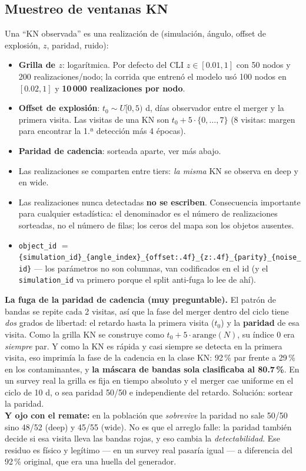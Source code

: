 \documentclass[11pt,a4paper]{article}
\newcommand{\code}[1]{\texttt{\small #1}}
\newlength{\examenpad}
\newenvironment{examen}
  {\par\medskip\noindent
   \begin{lrbox}{\examenbox}%
   \begin{minipage}{\dimexpr\linewidth-2\examenpad}\small}
  {\end{minipage}%
   \end{lrbox}%
   {\setlength{\fboxsep}{\examenpad}\colorbox{boxgray}{\usebox{\examenbox}}}%
   \par\medskip}
\begin{document}
\subsection{Muestreo de ventanas KN}
Una ``KN observada'' es una realización de
(simulación, ángulo, offset de explosión, $z$, paridad, ruido):
\begin{itemize}[nosep]
  \item \textbf{Grilla de $z$}: logarítmica. Por defecto del CLI $z\in[0.01,1]$ con 50 nodos y 200
        realizaciones/nodo; la corrida que entrenó el modelo usó 100 nodos en $[0.02,1]$ y
        \textbf{10\,000 realizaciones por nodo}.
  \item \textbf{Offset de explosión}: $t_0 \sim U[0,5)$ d, días observador entre el merger y la
        primera visita. Las visitas de una KN son $t_0 + 5\cdot\{0,\dots,7\}$ (8 visitas: margen para
        encontrar la 1.ª detección más 4 épocas).
  \item \textbf{Paridad de cadencia}: sorteada aparte, ver más abajo.
  \item Las realizaciones se comparten entre tiers: \emph{la misma} KN se observa en deep y en wide.
  \item Las realizaciones nunca detectadas \textbf{no se escriben}. Consecuencia importante para
        cualquier estadística: el denominador es el número de realizaciones sorteadas, no el número
        de filas; los ceros del mapa son los objetos ausentes.
  \item \code{object\_id} $=$
        \code{\{simulation\_id\}\_\{angle\_index\}\_\{offset:.4f\}\_\{z:.4f\}\_\{parity\}\_\{noise\_id\}}
        --- los parámetros no son columnas, van codificados en el id (y el \code{simulation\_id} va
        primero porque el split anti-fuga lo lee de ahí).
\end{itemize}

\begin{examen}
\textbf{La fuga de la paridad de cadencia (muy preguntable).} El patrón de bandas se repite cada 2
visitas, así que la fase del merger dentro del ciclo tiene \emph{dos} grados de libertad: el retardo
hasta la primera visita ($t_0$) y la \textbf{paridad} de esa visita. Como la grilla KN se construye
como $t_0 + 5\cdot\text{arange}(N)$, su índice 0 era \emph{siempre} par. Y como la KN es rápida y
casi siempre se detecta en la primera visita, eso imprimía la fase de la cadencia en la clase KN:
92\,\% par frente a 29\,\% en los contaminantes, y \textbf{la máscara de bandas sola clasificaba al
80.7\,\%}. En un survey real la grilla es fija en tiempo absoluto y el merger cae uniforme en el
ciclo de 10 d, o sea paridad 50/50 e independiente del retardo. Solución: sortear la paridad.\\[2pt]
\textbf{Y ojo con el remate:} en la población que \emph{sobrevive} la paridad no sale 50/50 sino
48/52 (deep) y 45/55 (wide). No es que el arreglo falle: la paridad también decide si esa visita
lleva las bandas rojas, y eso cambia la \emph{detectabilidad}. Ese residuo es físico y legítimo ---
en un survey real pasaría igual --- a diferencia del 92\,\% original, que era una huella del
generador.
\end{examen}
\end{document}
